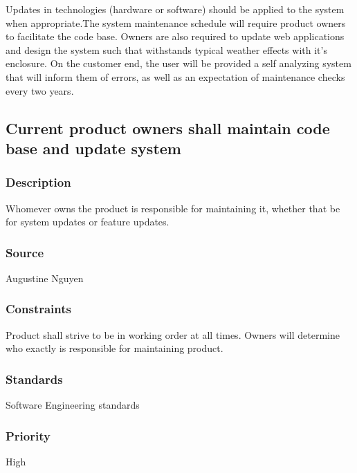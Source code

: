 Updates in technologies (hardware or software) should be applied to the system when appropriate.The system maintenance schedule will require product owners to facilitate the code base. Owners are also required to update web applications and design the system such that withstands typical weather effects with it's enclosure. On the customer end, the user will be provided a self analyzing system that will inform them of errors, as well as an expectation of maintenance checks every two years.
\subsection{Current product owners shall maintain code base and update system}
\subsubsection{Description}
Whomever owns the product is responsible for maintaining it, whether that be for system updates or feature updates.
\subsubsection{Source}
Augustine Nguyen
\subsubsection{Constraints}
Product shall strive to be in working order at all times.  Owners will determine who exactly is responsible for maintaining product.
\subsubsection{Standards}
Software Engineering standards
\subsubsection{Priority}
High